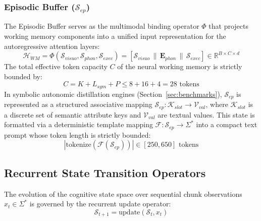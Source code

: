 \documentclass[11pt,a4paper]{article}
\begin{document}
\subsubsection{Episodic Buffer ($\mathcal{S}_{ep}$)}
The Episodic Buffer serves as the multimodal binding operator $\Phi$ that projects working memory components into a unified input representation for the autoregressive attention layers:
\begin{equation}
\mathcal{H}_{WM} = \Phi(\mathcal{S}_{visuo}, \mathcal{S}_{phon}, \mathcal{S}_{exec}) = \left[ \mathcal{S}_{visuo} \,\|\, \mathbf{E}_{phon} \,\|\, \mathcal{S}_{exec} \right] \in \mathbb{R}^{B \times C \times d}
\end{equation}
The total effective token capacity $C$ of the neural working memory is strictly bounded by:
\begin{equation}
C = K + L_{sym} + P \le 8 + 16 + 4 = 28 \text{ tokens}
\end{equation}
In symbolic autonomic distillation engines (Section~\ref{sec:benchmarks}), $\mathcal{S}_{ep}$ is represented as a structured associative mapping $\mathcal{S}_{ep}: \mathcal{K}_{slot} \to \mathcal{V}_{val}$, where $\mathcal{K}_{slot}$ is a discrete set of semantic attribute keys and $\mathcal{V}_{val}$ are textual values. This state is formatted via a deterministic template mapping $\mathcal{F}: \mathcal{S}_{ep} \to \Sigma^*$ into a compact text prompt whose token length is strictly bounded:
\begin{equation}
|\text{tokenize}(\mathcal{F}(\mathcal{S}_{ep}))| \in [250, 650] \text{ tokens}
\end{equation}

\subsection{Recurrent State Transition Operators}
The evolution of the cognitive state space over sequential chunk observations $x_t \in \Sigma^*$ is governed by the recurrent update operator:
\begin{equation}
\mathcal{S}_{t+1} = \text{update}(\mathcal{S}_t, x_t)
\end{equation}
\end{document}
